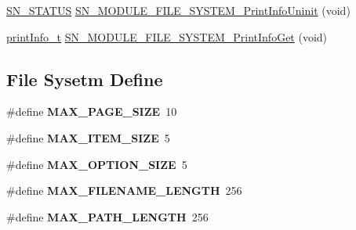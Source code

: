 \begin{DoxyCompactItemize}
\item 
\hyperlink{group__SYSTEM__ERROR_ga4540713b9a7a18ce44d78c3a10f7442f}{S\+N\+\_\+\+S\+T\+A\+T\+US} \hyperlink{group__MODULE__FILE__SYSTEM_gaddd6a0e37c98d7a5aba88db31875e44e}{S\+N\+\_\+\+M\+O\+D\+U\+L\+E\+\_\+\+F\+I\+L\+E\+\_\+\+S\+Y\+S\+T\+E\+M\+\_\+\+Print\+Info\+Uninit} (void)
\item 
\hyperlink{structprint__information}{print\+Info\+\_\+t} \hyperlink{group__MODULE__FILE__SYSTEM_ga6679d04769a997531a277ba3940cf16c}{S\+N\+\_\+\+M\+O\+D\+U\+L\+E\+\_\+\+F\+I\+L\+E\+\_\+\+S\+Y\+S\+T\+E\+M\+\_\+\+Print\+Info\+Get} (void)
\end{DoxyCompactItemize}
\subsection*{File Sysetm Define}
\begin{DoxyCompactItemize}
\item 
\mbox{\label{group__MODULE__FILE__SYSTEM_ga7c4410712a9f7874ae814e10ebbc3f5b}} 
\#define {\bfseries M\+A\+X\+\_\+\+P\+A\+G\+E\+\_\+\+S\+I\+ZE}~10
\item 
\mbox{\label{group__MODULE__FILE__SYSTEM_ga0b0dc907dfd588df63511d6dd1584f3e}} 
\#define {\bfseries M\+A\+X\+\_\+\+I\+T\+E\+M\+\_\+\+S\+I\+ZE}~5
\item 
\mbox{\label{group__MODULE__FILE__SYSTEM_gadfa24d79f2c854014012db924060062f}} 
\#define {\bfseries M\+A\+X\+\_\+\+O\+P\+T\+I\+O\+N\+\_\+\+S\+I\+ZE}~5
\item 
\mbox{\label{group__MODULE__FILE__SYSTEM_ga6773b93f3093658c3dcb569de3b4bdb2}} 
\#define {\bfseries M\+A\+X\+\_\+\+F\+I\+L\+E\+N\+A\+M\+E\+\_\+\+L\+E\+N\+G\+TH}~256
\item 
\mbox{\label{group__MODULE__FILE__SYSTEM_ga9eb6992d76f02128388ae95c0415604a}} 
\#define {\bfseries M\+A\+X\+\_\+\+P\+A\+T\+H\+\_\+\+L\+E\+N\+G\+TH}~256
\end{DoxyCompactItemize}
